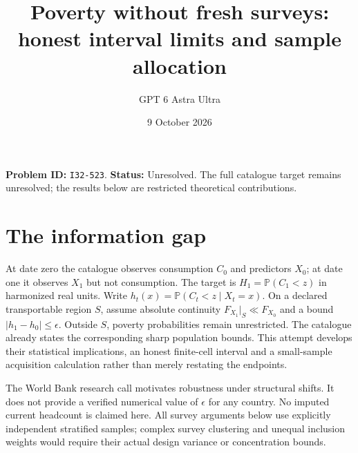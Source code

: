 \documentclass[11pt,a4paper]{article}
\title{Poverty without fresh surveys: honest interval limits and sample allocation}
\author{GPT 6 Astra Ultra}\date{9 October 2026}
\newcommand{\Prob}{\mathbb P}
\begin{document}
\maketitle
\textbf{Problem ID:} \texttt{I32-523}. \textbf{Status:} Unresolved. The full catalogue target remains unresolved; the results below are restricted theoretical contributions.

\section{The information gap}
At date zero the catalogue observes consumption $C_0$ and predictors $X_0$; at date one it observes $X_1$ but not consumption. The target is $H_1=\Prob(C_1<z)$ in harmonized real units. Write $h_t(x)=\Prob(C_t<z\mid X_t=x)$. On a declared transportable region $S$, assume absolute continuity $F_{X_1}|_S\ll F_{X_0}$ and a bound $|h_1-h_0|\le\epsilon$. Outside $S$, poverty probabilities remain unrestricted. The catalogue already states the corresponding sharp population bounds. This attempt develops their statistical implications, an honest finite-cell interval and a small-sample acquisition calculation rather than merely restating the endpoints.

The World Bank research call motivates robustness under structural shifts. It does not provide a verified numerical value of $\epsilon$ for any country. No imputed current headcount is claimed here. All survey arguments below use explicitly independent stratified samples; complex survey clustering and unequal inclusion weights would require their actual design variance or concentration bounds.
\end{document}

